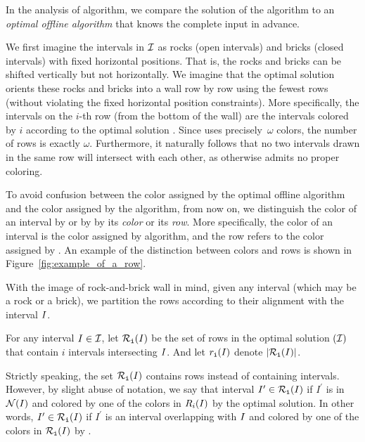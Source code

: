 \medskip

In the analysis of \ff algorithm, we compare the solution of the \ff algorithm to an \emph{optimal offline algorithm} \opt that knows the complete input in advance.

We first imagine the intervals in $\mathcal{I}$ as rocks (open intervals) and bricks (closed intervals) with fixed horizontal positions. 
That is, the rocks and bricks can be shifted vertically but not horizontally. 
We imagine that the optimal solution orients these rocks and bricks into a wall row by row using the fewest rows (without violating the fixed horizontal position constraints).
More specifically, the intervals on the $i$-th row (from the bottom of the wall) are the intervals colored by $i$ according to the optimal solution \opt.
Since \opt uses precisely~$\omega$ colors, the number of rows is exactly $\omega$.
Furthermore, it naturally follows that no two intervals drawn in the same row will intersect with each other, as otherwise \opt admits no proper coloring.


To avoid confusion between the color assigned by the optimal offline algorithm and the color assigned by the \ff algorithm, from now on, we distinguish the color of an interval by \ff or by \opt by its \emph{color} or its \emph{row}. 
More specifically, the color of an interval is the color assigned by \ff algorithm, and the row refers to the color assigned by \opt.
An example of the distinction between colors and rows is shown in Figure~\ref{fig:example_of_a_row}.

\medskip

With the image of rock-and-brick wall in mind, given any interval (which may be a rock or a brick), we partition the rows according to their alignment with the interval $I$.

\begin{definition}
    For any interval $I \in \mathcal{I}$, let $\mathcal{R}_\texttt{i}(I)$ be the set of rows in the optimal solution \opt{}$(\mathcal{I})$ that contain $i$ intervals intersecting $I$.
    And let $r_\texttt{\texttt{i}}(I)$ denote $|\mathcal{R}_\texttt{i}(I)|$. 
\end{definition}

Strictly speaking, the set $\mathcal{R}_\texttt{i}(I)$ contains rows instead of containing intervals.
However, by slight abuse of notation, we say that interval $I^\prime \in \mathcal{R}_\texttt{i}(I)$ if $I^\prime$ is in $\mathcal{N}(I)$ and colored by one of the colors in  $R_i(I)$ by the optimal solution.
In other words, $I^\prime \in \mathcal{R}_\texttt{i}(I)$ if $I^\prime$ is an interval overlapping with $I$ and colored by one of the colors in $\mathcal{R}_\texttt{i}(I)$ by \opt.

